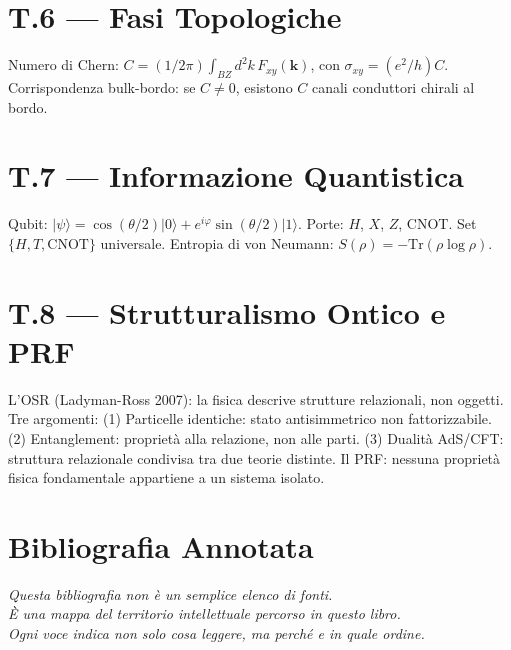 \documentclass[11.5pt,a4paper,openany]{book}
\theoremstyle{remark}
\begin{document}
\chapter*{T.6 --- Fasi Topologiche}

Numero di Chern: $C = (1/2\pi)\int_{BZ}d^2k\,F_{xy}(\mathbf{k})$, con $\sigma_{xy} = (e^2/h)C$.
Corrispondenza bulk-bordo: se $C\neq 0$, esistono $C$ canali conduttori chirali al bordo.

\chapter*{T.7 --- Informazione Quantistica}

Qubit: $|\psi\rangle = \cos(\theta/2)|0\rangle + e^{i\varphi}\sin(\theta/2)|1\rangle$.
Porte: $H$, $X$, $Z$, CNOT. Set $\{H,T,\mathrm{CNOT}\}$ universale.
Entropia di von Neumann: $S(\rho) = -\mathrm{Tr}(\rho\log\rho)$.

\chapter*{T.8 --- Strutturalismo Ontico e PRF}

L'OSR (Ladyman-Ross 2007): la fisica descrive strutture relazionali, non oggetti. Tre argomenti: (1) Particelle identiche: stato antisimmetrico non fattorizzabile. (2) Entanglement: proprietà alla relazione, non alle parti. (3) Dualità AdS/CFT: struttura relazionale condivisa tra due teorie distinte. Il PRF: nessuna proprietà fisica fondamentale appartiene a un sistema isolato.

\chapter*{Bibliografia Annotata}

\begin{center}
{\small\itshape\color{captionink}
Questa bibliografia non è un semplice elenco di fonti.\\
È una mappa del territorio intellettuale percorso in questo libro.\\
Ogni voce indica non solo cosa leggere, ma perché e in quale ordine.}
\end{center}
\end{document}
